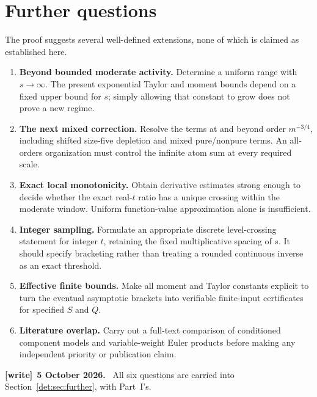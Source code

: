 \documentclass[11pt,letterpaper]{article}
\numberwithin{equation}{section}
\theoremstyle{definition}\newtheorem{definition}[theorem]{Definition}
\theoremstyle{remark}\newtheorem{remark}[theorem]{Remark}
\newenvironment{writenote}[1][]{\par\smallskip\begingroup\small
 \noindent\textbf{[write]}\if\relax\detokenize{#1}\relax\else~\textbf{#1.}\fi\ }%
 {\par\endgroup\smallskip}
\begin{document}
\section{Further questions}\label{det:grow:sec:further}
The proof suggests several well-defined extensions, none of which is
claimed as established here.
\begin{enumerate}
 \item \textbf{Beyond bounded moderate activity.} Determine a uniform
 range with $s\to\infty$. The present exponential Taylor and moment
 bounds depend on a fixed upper bound for $s$; simply allowing that
 constant to grow does not prove a new regime.
 \item \textbf{The next mixed correction.} Resolve the terms at and
 beyond order $m^{-3/4}$, including shifted size-five depletion and
 mixed pure/nonpure terms. An all-orders organization must control
 the infinite atom sum at every required scale.
 \item \textbf{Exact local monotonicity.} Obtain derivative estimates
 strong enough to decide whether the exact real-$t$ ratio has a
 unique crossing within the moderate window. Uniform function-value
 approximation alone is insufficient.
 \item \textbf{Integer sampling.} Formulate an appropriate discrete
 level-crossing statement for integer $t$, retaining the fixed
 multiplicative spacing of $s$. It should specify bracketing rather
 than treating a rounded continuous inverse as an exact threshold.
 \item \textbf{Effective finite bounds.} Make all moment and Taylor
 constants explicit to turn the eventual asymptotic brackets into
 verifiable finite-input certificates for specified $S$ and $Q$.
 \item \textbf{Literature overlap.} Carry out a full-text comparison of
 conditioned component models and variable-weight Euler products
 before making any independent priority or publication claim.
\end{enumerate}
\begin{writenote}[5 October 2026]
All six questions are carried into Section~\ref{det:sec:further}, with Part~I's.
\end{writenote}
\end{document}
